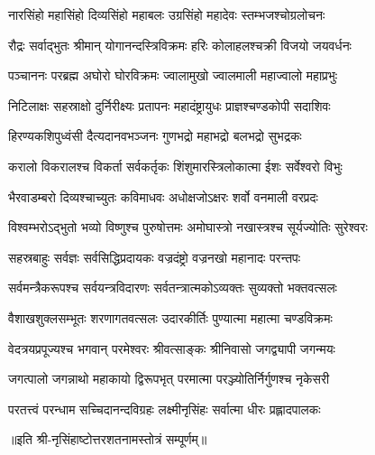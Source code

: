 

\twolineshloka
{नारसिंहो महासिंहो दिव्यसिंहो महाबलः}
{उग्रसिंहो महादेवः स्तम्भजश्चोग्रलोचनः}

\twolineshloka
{रौद्रः सर्वाद्भुतः श्रीमान् योगानन्दस्त्रिविक्रमः}
{हरिः कोलाहलश्चक्री विजयो जयवर्धनः}

\twolineshloka
{पञ्चाननः परब्रह्म अघोरो घोरविक्रमः}
{ज्वालामुखो ज्वालमाली महाज्वालो महाप्रभुः}

\twolineshloka
{निटिलाक्षः सहस्राक्षो दुर्निरीक्ष्यः प्रतापनः}
{महादंष्ट्रायुधः  प्राज्ञश्चण्डकोपी सदाशिवः}

\twolineshloka
{हिरण्यकशिपुध्वंसी दैत्यदानवभञ्जनः}
{गुणभद्रो महाभद्रो बलभद्रो सुभद्रकः}

\twolineshloka
{करालो विकरालश्च विकर्ता सर्वकर्तृकः}
{शिंशुमारस्त्रिलोकात्मा ईशः सर्वेश्वरो विभुः}

\twolineshloka
{भैरवाडम्बरो दिव्यश्चाच्युतः कविमाधवः}
{अधोक्षजोऽक्षरः शर्वो वनमाली वरप्रदः}

\twolineshloka
{विश्वम्भरोऽद्भुतो भव्यो विष्णुश्च पुरुषोत्तमः}
{अमोघास्त्रो नखास्त्रश्च सूर्यज्योतिः सुरेश्वरः}

\twolineshloka
{सहस्रबाहुः सर्वज्ञः सर्वसिद्धिप्रदायकः}
{वज्रदंष्ट्रो वज्रनखो महानादः परन्तपः}

\twolineshloka
{सर्वमन्त्रैकरूपश्च सर्वयन्त्रविदारणः}
{सर्वतन्त्रात्मकोऽव्यक्तः सुव्यक्तो भक्तवत्सलः}

\twolineshloka
{वैशाखशुक्लसम्भूतः शरणागतवत्सलः}
{उदारकीर्तिः पुण्यात्मा महात्मा चण्डविक्रमः}

\twolineshloka
{वेदत्रयप्रपूज्यश्च भगवान् परमेश्वरः}
{श्रीवत्साङ्कः श्रीनिवासो जगद्व्यापी  जगन्मयः}

\twolineshloka
{जगत्पालो जगन्नाथो महाकायो द्विरूपभृत्}
{परमात्मा परञ्ज्योतिर्निर्गुणश्च नृकेसरी}

\twolineshloka
{परतत्त्वं परन्धाम सच्चिदानन्दविग्रहः}
{लक्ष्मीनृसिंहः सर्वात्मा धीरः प्रह्लादपालकः}

॥इति श्री-नृसिंहाष्टोत्तरशतनामस्तोत्रं सम्पूर्णम्॥
